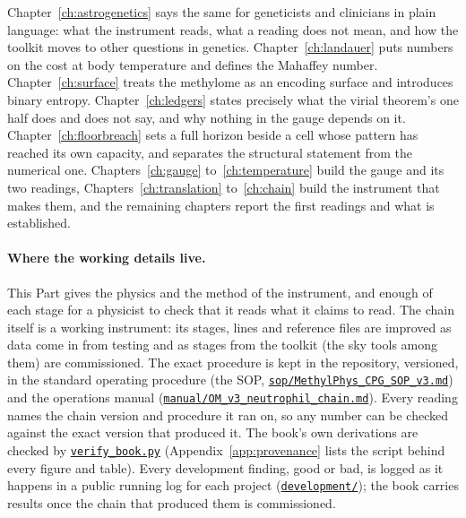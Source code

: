 Chapter~\ref{ch:astrogenetics} says the same for geneticists and clinicians in plain language: what the instrument reads, what a reading
does not mean, and how the toolkit moves to other questions in genetics.
Chapter~\ref{ch:landauer} puts numbers on the cost at body temperature and defines the Mahaffey
number. Chapter~\ref{ch:surface} treats the methylome as an encoding surface and introduces binary
entropy. Chapter~\ref{ch:ledgers} states precisely what the virial theorem's one half does and does not say, and why
nothing in the gauge depends on it. Chapter~\ref{ch:floorbreach} sets a full horizon beside a cell whose pattern has
reached its own capacity, and separates the structural statement from the numerical one.
Chapters~\ref{ch:gauge} to~\ref{ch:temperature} build the gauge and its two readings, Chapters~\ref{ch:translation}
to~\ref{ch:chain} build the instrument that makes them, and the remaining chapters report the first readings and what is
established.

\paragraph{Where the working details live.} This Part gives the physics and the method of the instrument, and enough of each stage
for a physicist to check that it reads what it claims to read. The chain itself is a working instrument: its stages, lines and reference
files are improved as data come in from testing and as stages from the toolkit (the sky tools among them) are commissioned. The exact
procedure is kept in the repository, versioned, in the standard operating procedure (the SOP,
\href{https://github.com/hmahaffeyges/IAM-Validation/blob/main/Biological_Physics/MethylPhys/sop/MethylPhys_CPG_SOP_v3.md}{\texttt{sop/MethylPhys\_CPG\_SOP\_v3.md}}) and the operations
manual (\href{https://github.com/hmahaffeyges/IAM-Validation/blob/main/Biological_Physics/MethylPhys/manual/OM_v3_neutrophil_chain.md}{\texttt{manual/OM\_v3\_neutrophil\_chain.md}}).
Every reading names the chain version and procedure it ran on, so any number can be checked against the exact version that produced it.
The book's own derivations are checked by \href{https://github.com/hmahaffeyges/IAM-Validation/blob/main/docs/book/verify_book.py}{\texttt{verify\_book.py}} (Appendix~\ref{app:provenance}
lists the script behind every figure and table). Every development finding, good or bad, is logged as it happens in a public running log for
each project (\href{https://github.com/hmahaffeyges/IAM-Validation/tree/main/development}{\texttt{development/}}); the book carries results once the
chain that produced them is commissioned.
